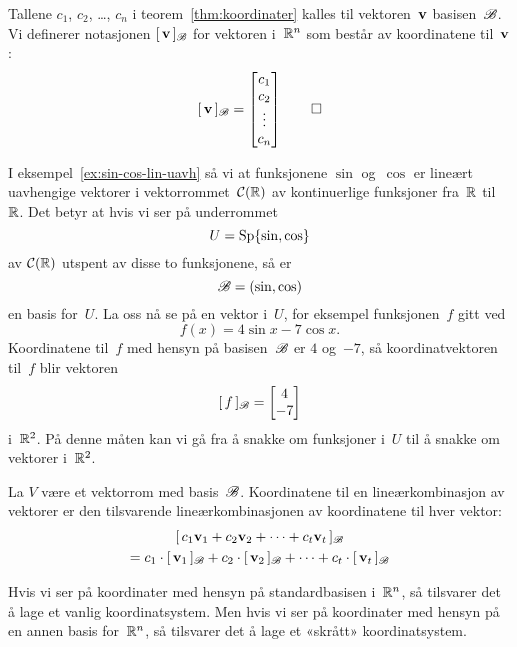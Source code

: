 \begin{defn}
Tallene $c_1$, $c_2$, \ldots, $c_n$ i teorem~\ref{thm:koordinater}
kalles  til vektoren~$\mathbf{v}$  basisen~$\mathscr{B}$.  Vi definerer notasjonen $[\,{\mathbf{v}}\,]_{\mathscr{B}}$ for
vektoren i~$\mathbb{R}^n$ som består av koordinatene til~$\mathbf{v}$:
\[
[\,{\mathbf{v}}\,]_{\mathscr{B}} = \begin{bmatrix} c_1 \\ c_2 \\ \vdots \\ c_n \end{bmatrix}\qedhere
\]
\end{defn}

\begin{ex}
I eksempel~\ref{ex:sin-cos-lin-uavh} så vi at funksjonene $\sin$
og~$\cos$ er lineært uavhengige vektorer i vektorrommet~$\mathcal{C}(\mathbb{R})$ av
kontinuerlige funksjoner fra~$\mathbb{R}$ til~$\mathbb{R}$.  Det betyr at hvis vi ser
på underrommet
\[
U = \operatorname{Sp} \{ \sin, \cos \}
\]
av $\mathcal{C}(\mathbb{R})$ utspent av disse to funksjonene, så er
\[
\mathscr{B} = (\sin, \cos)
\]
en basis for~$U$.  La oss nå se på en vektor i~$U$, for eksempel
funksjonen~$f$ gitt ved
\[
f(x) = 4 \sin x - 7 \cos x.
\]
Koordinatene til~$f$ med hensyn på basisen~$\mathscr{B}$ er $4$ og~$-7$, så
koordinatvektoren til~$f$ blir vektoren
\[
[\,{f}\,]_{\mathscr{B}} = \begin{bmatrix} 4 \\ -7 \end{bmatrix}
\]
i~$\mathbb{R}^2$.  På denne måten kan vi gå fra å snakke om funksjoner i~$U$
til å snakke om vektorer i~$\mathbb{R}^2$.
\end{ex}


\begin{thm}
\label{thm:koordinater-lin-komb}
La $V$ være et vektorrom med basis~$\mathscr{B}$.  Koordinatene til en
lineærkombinasjon av vektorer er den tilsvarende lineærkombinasjonen
av koordinatene til hver vektor:
\begin{multline*}
[\,{c_1 \mathbf{v}_1 + c_2 \mathbf{v}_2 + \cdots + c_t \mathbf{v}_t}\,]_{\mathscr{B}}\\
= c_1 \cdot [\,{\mathbf{v}_1}\,]_{\mathscr{B}} + c_2 \cdot [\,{\mathbf{v}_2}\,]_{\mathscr{B}} + \cdots + c_t \cdot [\,{\mathbf{v}_t}\,]_{\mathscr{B}}
\end{multline*}
\end{thm}

Hvis vi ser på koordinater med hensyn på standardbasisen i~$\mathbb{R}^n$, så
tilsvarer det å lage et vanlig koordinatsystem.  Men hvis vi ser på
koordinater med hensyn på en annen basis for~$\mathbb{R}^n$, så tilsvarer det
å lage et «skrått» koordinatsystem.

